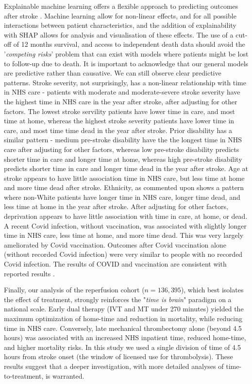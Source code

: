 Explainable machine learning offers a flexible approach to predicting outcomes after stroke \cite{pearn2026machine}. Machine learning allow for non-linear effects, and for all possible interactions between patient characteristics, and the addition of explainability with SHAP allows for analysis and visualisation of these effects. The use of a cut-off of 12 months survival, and access to independent death data should avoid the '\textit{competing risks}' problem that can exist with models where patients might be lost to follow-up due to death. It is important to acknowledge that our general models are predictive rather than causative. We can still observe clear predictive patterns. Stroke severity, not surprisingly, has a non-linear relationship with time in NHS care - patients with moderate and moderate-severe stroke severity have the highest time in NHS care in the year after stroke, after adjusting for other factors. The lowest stroke servility patients have lower time in care, and most time at home, whereas the highest stroke severity patients have lower time in care, and most time time dead in the year after stroke. Prior disability has a similar pattern - medium pre-stroke disability have the the longest time in NHS care after adjusting for other factors, whereas low pre-stroke disability predicts shorter time in care and longer time at home, whereas high pre-stroke disability predicts shorter time in care and longer time dead in the year after stroke. Age at stroke appears to have little association time in NHS care, but less time at home and more time dead after stroke. Ethnicity, as commented upon shows a pattern where non-White patients have longer time in NHS care, longer time dead, and less time at home in the year after stroke. After adjusting for other factors, deprivation  appears to have little association with time in care, at home, or dead. A recent Covid infection, without vaccination, was associated with slightly longer time in NHS care, less time at home, and more time dead. This was very largely ameliorated by Covid vaccination. Outcomes after Covid vaccination alone (without recorded Covid infection) were very similar to people with no recorded Covid infection. The results of COVID and vaccination are consistent with reported results \cite{el2025vaccination, rizzo2022covid}.

Finally, our analysis of the reperfusion cohort ($n = 136,395$), which best isolates the effect of treatment, strongly reinforces the "\textit{time is brain}" paradigm \cite{saver2006time} on a national scale. Early dual therapy (IVT and MT under 270 minutes) yielded the maximum optimization of home-time and reduction in mortality, while reducing time in NHS care. Conversely, late mechanical thrombectomy alone (beyond 4.5 hours) was associated with an increased NHS inpatient time, reduced home-time, and higher mortality risks. In this study we used a single division of time of 4.5 hours from stroke onset (the window of licensed use for thrombolysis). These results suggest that a deeper investigation, with more detailed analyses of time-to-treatment, is warranted.

